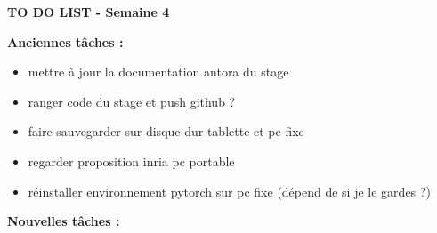 \documentclass{article}
\begin{document}
	\begin{center}
		\Large\textbf{{TO DO LIST} - Semaine 4}
	\end{center}
	
	\textbf{Anciennes tâches :}
	
	\begin{itemize}[label=$\square$]
		\item mettre à jour la documentation antora du stage
		\item ranger code du stage et push github ?
		\item faire sauvegarder sur disque dur tablette et pc fixe
		\item regarder proposition inria pc portable
		\item réinstaller environnement pytorch sur pc fixe (dépend de si je le gardes ?)
	\end{itemize}
	
	\textbf{Nouvelles tâches :}
	
\end{document}
